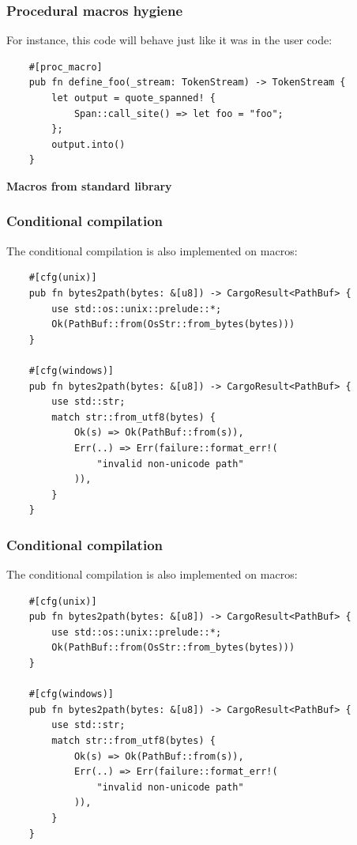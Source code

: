 \documentclass[aspectratio=1610,t]{beamer}
\begin{document}

\begin{frame}[fragile]
\frametitle{Procedural macros hygiene}
For instance, this code will behave just like it was in the user code:

\begin{verbatim}
    #[proc_macro]
    pub fn define_foo(_stream: TokenStream) -> TokenStream {
        let output = quote_spanned! {
            Span::call_site() => let foo = "foo";
        };
        output.into()
    }
\end{verbatim}
\end{frame}


\begin{frame}[c]
\centering\Huge\textbf{Macros from standard library}
\end{frame}


\begin{frame}[fragile,c]
\frametitle{Conditional compilation}
The conditional compilation is also implemented on macros:

\begin{verbatim}
    #[cfg(unix)]
    pub fn bytes2path(bytes: &[u8]) -> CargoResult<PathBuf> {
        use std::os::unix::prelude::*;
        Ok(PathBuf::from(OsStr::from_bytes(bytes)))
    }

    #[cfg(windows)]
    pub fn bytes2path(bytes: &[u8]) -> CargoResult<PathBuf> {
        use std::str;
        match str::from_utf8(bytes) {
            Ok(s) => Ok(PathBuf::from(s)),
            Err(..) => Err(failure::format_err!(
                "invalid non-unicode path"
            )),
        }
    }
\end{verbatim}
\end{frame}


\begin{frame}[fragile,c]
\frametitle{Conditional compilation}
The conditional compilation is also implemented on macros:

\begin{verbatim}
    #[cfg(unix)]
    pub fn bytes2path(bytes: &[u8]) -> CargoResult<PathBuf> {
        use std::os::unix::prelude::*;
        Ok(PathBuf::from(OsStr::from_bytes(bytes)))
    }

    #[cfg(windows)]
    pub fn bytes2path(bytes: &[u8]) -> CargoResult<PathBuf> {
        use std::str;
        match str::from_utf8(bytes) {
            Ok(s) => Ok(PathBuf::from(s)),
            Err(..) => Err(failure::format_err!(
                "invalid non-unicode path"
            )),
        }
    }
\end{verbatim}
\end{frame}
\end{document}
